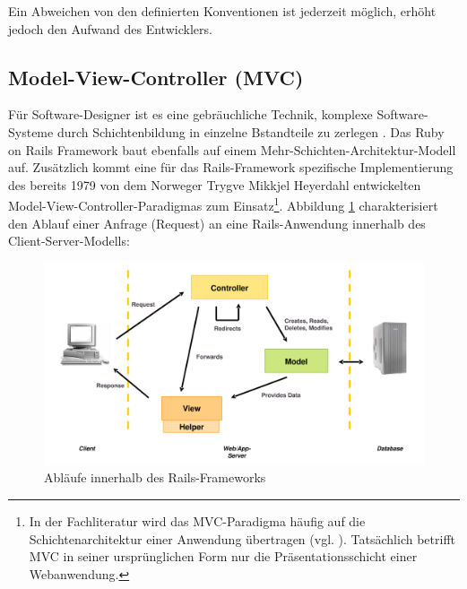 Ein Abweichen von den definierten Konventionen ist jederzeit möglich, erhöht jedoch den Aufwand des Entwicklers.

\subsection{Model-View-Controller (MVC)}
\label{sec:mvc}
Für Software-Designer ist es  eine gebräuchliche Technik, komplexe Software-Systeme durch Schichtenbildung in einzelne Bstandteile zu zerlegen \citep[Kapitel 1]{FowlerPatterns}. Das Ruby on Rails Framework baut ebenfalls auf einem Mehr-Schichten-Architektur-Modell auf. Zusätzlich kommt eine für das Rails-Framework spezifische Implementierung des bereits 1979 von dem Norweger Trygve Mikkjel Heyerdahl entwickelten Model-View-Controller-Paradigmas zum Einsatz\footnote{In der Fachliteratur wird das MVC-Paradigma häufig auf die Schichtenarchitektur einer Anwendung übertragen (vgl. \cite[S. 544 ff.]{objekt}). Tatsächlich betrifft MVC in seiner  ursprünglichen Form nur die Präsentationsschicht einer Webanwendung.}.
Abbildung \ref{fig:mvcimage} charakterisiert den Ablauf einer Anfrage (Request) an eine Rails-Anwendung innerhalb des Client-Server-Modells:

\begin{figure}[!h]
\begin{center}
\includegraphics[scale=0.4]{images/analyse/mvc.png}
\caption{Abläufe innerhalb des Rails-Frameworks}
\label{fig:mvcimage}
\end{center}
\end{figure}

